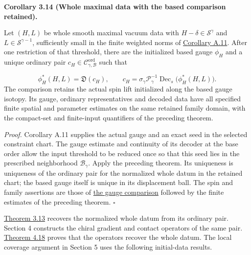 \documentclass[
  english,
  11pt,
  reqno]{amsart}
\makeatletter
\newcommand{\pandocstatementheading}[1]{%
  \par\addpenalty{\@beginparpenalty}%
  \addvspace{.5\baselineskip plus .2\baselineskip minus .2\baselineskip}%
  {\normalfont\bfseries #1\par}%
  \nobreak\@afterindenttrue\@afterheading
}
\makeatother
\begin{document}
\pandocstatementheading{\leavevmode{}\label{cor:online-ordinary-pair-ungauged-access}Corollary 3.14 (Whole maximal data with the based comparison retained).}

Let \((H,L)\) be whole smooth maximal vacuum data with
\(H-\delta\in\mathscr S^\gamma\) and \(L\in\mathscr S^{\gamma-1}\),
sufficiently small in the finite weighted norms of
\hyperref[cor:online-gauge-whole-data-decoding]{Corollary A.11}. After
one restriction of that threshold, there are the initialized based gauge
\(\phi_H\) and a unique ordinary pair
\(c_H\in\mathscr C^{\mathrm{ord}}_{\gamma,\mathcal B}\) such that

\label{eq:online-ordinary-based-whole-data-recovery} \[
\phi_H^*(H,L)=\mathfrak D(c_H),
\qquad
c_H=\sigma_\gamma\mathscr P_\gamma^{-1}
       \operatorname{Dec}_{s}\bigl(\phi_H^*(H,L)\bigr).
\] The comparison retains the actual spin lift initialized along the
based gauge isotopy. Its gauge, ordinary representatives and decoded
data have all specified finite spatial and parameter estimates on the
same retained family domain, with the compact-set and finite-input
quantifiers of the preceding theorem.

\emph{Proof.} Corollary A.11 supplies the actual gauge and an exact seed
in the selected constraint chart. The gauge estimate and continuity of
its decoder at the base order allow the input threshold to be reduced
once so that this seed lies in the prescribed neighborhood
\(\mathcal B_\gamma\). Apply the preceding theorem. Its uniqueness is
uniqueness of the ordinary pair for the normalized whole datum in the
retained chart; the based gauge itself is unique in its displacement
ball. The spin and family assertions are those of
\hyperref[prop:online-gauge-rotation-and-spin]{the gauge comparison}
followed by the finite estimates of the preceding theorem.
\hfill\(\square\)

\hyperref[thm:online-ordinary-pair-data-bijection]{Theorem 3.13}
recovers the normalized whole datum from its ordinary pair. Section 4
constructs the chiral gradient and contact operators of the same pair.
\hyperref[thm:online-ordinary-negative-response-initial-source]{Theorem
4.18} proves that the operators recover the whole datum. The local
coverage argument in Section 5 uses the following initial-data results.
\end{document}
